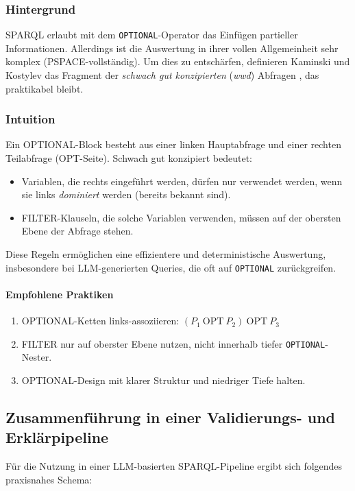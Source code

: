 \subsubsection{Hintergrund}
SPARQL erlaubt mit dem \texttt{OPTIONAL}-Operator das Einfügen partieller Informationen. Allerdings ist die Auswertung in ihrer vollen Allgemeinheit sehr komplex (PSPACE-vollständig). Um dies zu entschärfen, definieren Kaminski und Kostylev das Fragment der \emph{schwach gut konzipierten} (\emph{wwd}) Abfragen \cite{kaminski-kostylev-beyond-well-designed}, das praktikabel bleibt.

\subsubsection{Intuition}
Ein OPTIONAL-Block besteht aus einer linken Hauptabfrage und einer rechten Teilabfrage (OPT-Seite). Schwach gut konzipiert bedeutet:
\begin{itemize}
\item Variablen, die rechts eingeführt werden, dürfen nur verwendet werden, wenn sie links \emph{dominiert} werden (bereits bekannt sind).
\item FILTER-Klauseln, die solche Variablen verwenden, müssen auf der obersten Ebene der Abfrage stehen.
\end{itemize}
Diese Regeln ermöglichen eine effizientere und deterministische Auswertung, insbesondere bei LLM-generierten Queries, die oft auf \texttt{OPTIONAL} zurückgreifen.

\paragraph{Empfohlene Praktiken}
\begin{enumerate}
\item OPTIONAL-Ketten links-assoziieren: \((P_1~\mathrm{OPT}~P_2)~\mathrm{OPT}~P_3\)
\item FILTER nur auf oberster Ebene nutzen, nicht innerhalb tiefer \texttt{OPTIONAL}-Nester.
\item OPTIONAL-Design mit klarer Struktur und niedriger Tiefe halten.
\end{enumerate}

\subsection{Zusammenführung in einer Validierungs- und Erklärpipeline}

Für die Nutzung in einer LLM-basierten SPARQL-Pipeline ergibt sich folgendes praxisnahes Schema:

